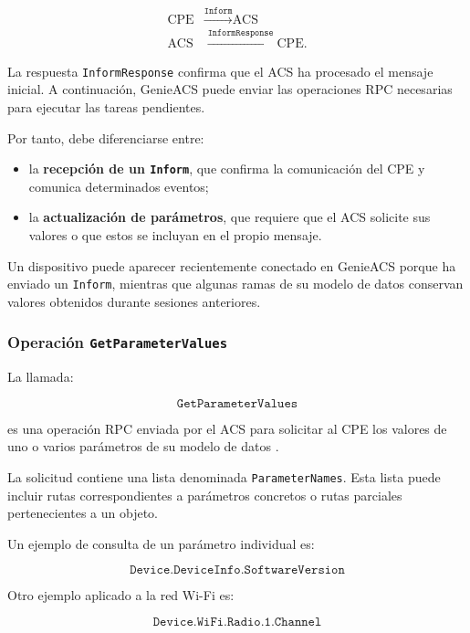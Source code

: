 \[
\begin{aligned}
    \text{CPE}
    &\xrightarrow{\texttt{Inform}}
    \text{ACS}\\
    \text{ACS}
    &\xrightarrow{\texttt{InformResponse}}
    \text{CPE}.
\end{aligned}
\]

La respuesta \texttt{InformResponse} confirma que el ACS ha procesado el
mensaje inicial. A continuación, GenieACS puede enviar las operaciones
RPC necesarias para ejecutar las tareas pendientes.

Por tanto, debe diferenciarse entre:

\begin{itemize}
    \item la \textbf{recepción de un \texttt{Inform}}, que confirma la
    comunicación del CPE y comunica determinados eventos;

    \item la \textbf{actualización de parámetros}, que requiere que el
    ACS solicite sus valores o que estos se incluyan en el propio
    mensaje.
\end{itemize}

Un dispositivo puede aparecer recientemente conectado en GenieACS porque
ha enviado un \texttt{Inform}, mientras que algunas ramas de su modelo de
datos conservan valores obtenidos durante sesiones anteriores.


\subsubsection*{Operación \texttt{GetParameterValues}}

La llamada:

\[
    \texttt{GetParameterValues}
\]

es una operación RPC enviada por el ACS para solicitar al CPE los valores
de uno o varios parámetros de su modelo de datos
\cite{bbf_tr069}.

La solicitud contiene una lista denominada \texttt{ParameterNames}. Esta
lista puede incluir rutas correspondientes a parámetros concretos o rutas
parciales pertenecientes a un objeto.

Un ejemplo de consulta de un parámetro individual es:

\[
    \texttt{Device.DeviceInfo.SoftwareVersion}
\]

Otro ejemplo aplicado a la red Wi-Fi es:

\[
    \texttt{Device.WiFi.Radio.1.Channel}
\]

